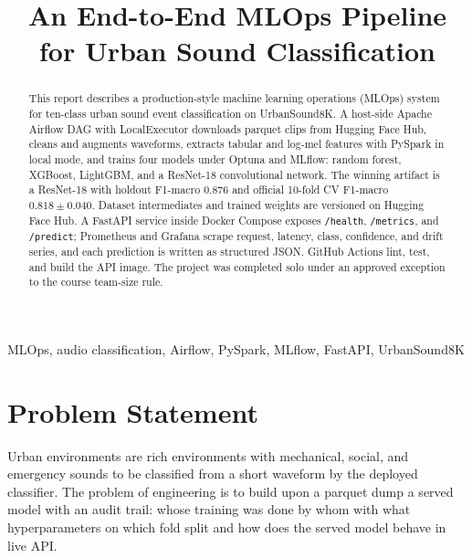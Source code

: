 \documentclass[conference]{IEEEtran}
\begin{document}
\title{An End-to-End MLOps Pipeline for Urban Sound Classification}

\author{
  }

\maketitle

\begin{abstract}
  This report describes a production-style machine learning operations (MLOps) system for ten-class urban sound event classification on UrbanSound8K.
  A host-side Apache Airflow DAG with LocalExecutor downloads parquet clips from Hugging Face Hub, cleans and augments waveforms, extracts tabular and log-mel features with PySpark in local mode, and trains four models under Optuna and MLflow: random forest, XGBoost, LightGBM, and a ResNet-18 convolutional network.
  The winning artifact is a ResNet-18 with holdout F1-macro \(0.876\) and official 10-fold CV F1-macro \(0.818\pm 0.040\).
  Dataset intermediates and trained weights are versioned on Hugging Face Hub.
  A FastAPI service inside Docker Compose exposes \texttt{/health}, \texttt{/metrics}, and \texttt{/predict}; Prometheus and Grafana scrape request, latency, class, confidence, and drift series, and each prediction is written as structured JSON.
  GitHub Actions lint, test, and build the API image.
  The project was completed solo under an approved exception to the course team-size rule.
\end{abstract}

\begin{IEEEkeywords}
  MLOps, audio classification, Airflow, PySpark, MLflow, FastAPI, UrbanSound8K
\end{IEEEkeywords}

\section{Problem Statement}
\label{sec:problem}

Urban environments are rich environments with mechanical, social, and emergency sounds to be classified from a short waveform by the deployed classifier.
The problem of engineering is to build upon a parquet dump a served model with an audit trail: whose training was done by whom with what hyperparameters on which fold split and how does the served model behave in live API.
\end{document}
